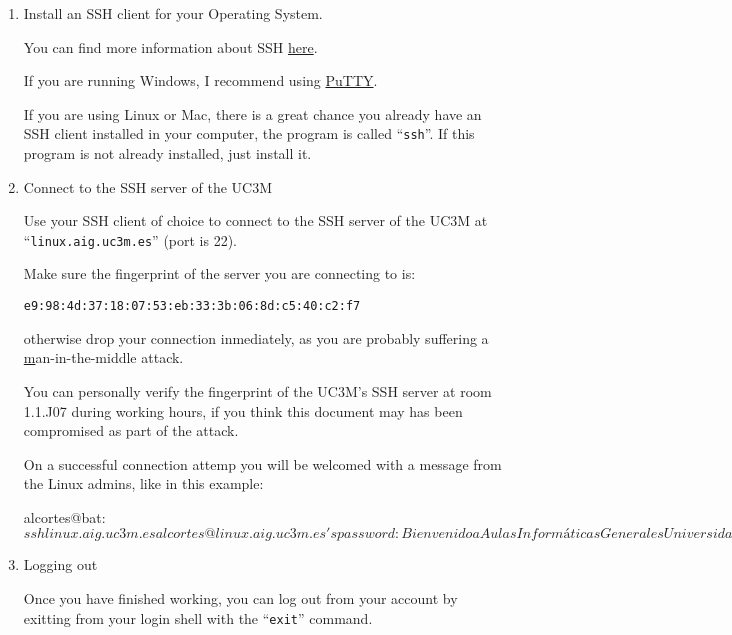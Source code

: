 \documentclass[a4paper, 12pt]{article}
\begin{document}
  \begin{enumerate}

    \item Install an SSH client for your Operating System.

      You can find more information about SSH
      \href{http://en.wikipedia.org/wiki/Secure_Shell}{here}.

      If you are running Windows, I recommend using
      \href{http://www.chiark.greenend.org.uk/~sgtatham/putty/download.html}{PuTTY}.

      If you are using Linux or Mac, there is a great chance you
      already have an SSH client installed in your computer, the program is
      called ``\texttt{ssh}''. If this program is not already installed, just
      install it.

    \item Connect to the SSH server of the UC3M

      Use your SSH client of choice to connect to the SSH server of the UC3M at
      ``\texttt{linux.aig.uc3m.es}'' (port is 22).

      Make sure the fingerprint of the server you are connecting to is:

      \begin{center}
        \texttt{e9:98:4d:37:18:07:53:eb:33:3b:06:8d:c5:40:c2:f7}
      \end{center}

      otherwise drop your connection inmediately, as you are probably suffering
      a
      \href{http://en.wikipedia.org/wiki/Man-in-the-middle_attackman-in-the-middle}
      man-in-the-middle attack.

      You can personally verify the fingerprint of the UC3M's SSH server at
      room 1.1.J07 during working hours, if you think this document may has
      been compromised as part of the attack.

      On a successful connection attemp you will be
      welcomed with a message from the Linux admins, like in this example:

\begin{blackboard}
alcortes@bat:~$ ssh linux.aig.uc3m.es
alcortes@linux.aig.uc3m.es's password: 

       Bienvenido a Aulas Informáticas Generales
          Universidad Carlos III de Madrid

          Puede contactar con nosotros en:
     
                gsai@aig.uc3m.es

Last login: Tue Jan 13 13:53:33 2015 from bat.it.uc3m.es
alcortes@linux:~$
\end{blackboard}

    \item Logging out

      Once you have finished working, you can log out from
      your account by exitting from your login shell with the ``\texttt{exit}''
      command.

  \end{enumerate}
\end{document}
